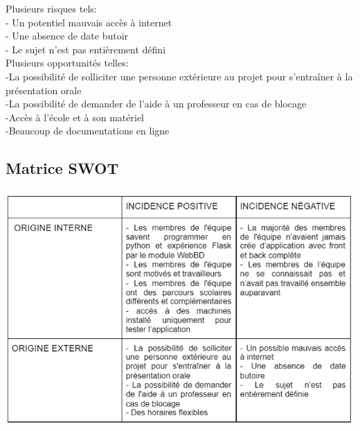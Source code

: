 \begin{itemize}
                \qquad Plusieurs risques tels: \\
 - Un potentiel mauvais accès à internet\\
- Une absence de date butoir\\
- Le sujet n’est pas entièrement défini\\


	            \qquad Plusieurs opportunités telles:\\
-La possibilité de solliciter une personne extérieure au projet pour s'entraîner à la présentation orale\\

-La possibilité de demander de l'aide à un professeur en cas de blocage\\

-Accès à l’école et à son matériel\\
-Beaucoup de documentations en ligne\\

                 
                \end{itemize}   
                
            
                
            \subsection{Matrice SWOT}
    
                
                 \begin{center}
         \includegraphics[width=15cm]{swot.png}\\

         \end{center}
    

